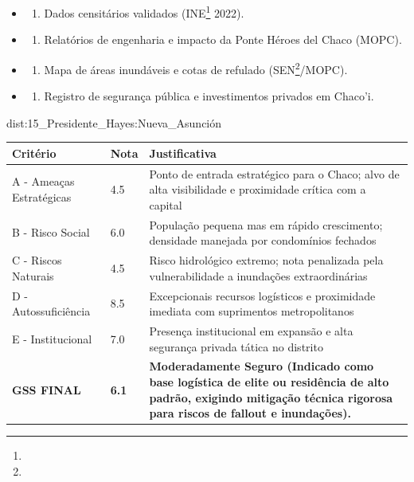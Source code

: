 {\begin{itemize}
\tightlist
\item
  \begin{enumerate}
  \def\labelenumi{\arabic{enumi})}
  \tightlist
  \item
    Dados censitários validados (INE\footnote{\fineINE} 2022).
  \end{enumerate}
\item
  \begin{enumerate}
  \def\labelenumi{\arabic{enumi})}
  \setcounter{enumi}{1}
  \tightlist
  \item
    Relatórios de engenharia e impacto da Ponte Héroes del Chaco (MOPC).
  \end{enumerate}
\item
  \begin{enumerate}
  \def\labelenumi{\arabic{enumi})}
  \setcounter{enumi}{2}
  \tightlist
  \item
    Mapa de áreas inundáveis e cotas de refulado (SEN\footnote{\fineSEN}/\allowbreak MOPC).
  \end{enumerate}
\item
  \begin{enumerate}
  \def\labelenumi{\arabic{enumi})}
  \setcounter{enumi}{3}
  \tightlist
  \item
    Registro de segurança pública e investimentos privados em Chaco'i.
  \end{enumerate}
\end{itemize}}{dist:15_Presidente_Hayes:Nueva_Asunción}
\begin{table}[ht!]
\small \begin{tabular}{p{3.0cm}p{0.8cm}p{6.0cm}} \toprule
\textbf{Critério} & \textbf{Nota} & \textbf{Justificativa} \\ \midrule
A - Ameaças Estratégicas & 4.5 & Ponto de entrada estratégico para o Chaco; alvo de alta visibilidade e proximidade crítica com a capital \\
B - Risco Social & 6.0 & População pequena mas em rápido crescimento; densidade manejada por condomínios fechados \\
C - Riscos Naturais & 4.5 & Risco hidrológico extremo; nota penalizada pela vulnerabilidade a inundações extraordinárias \\
D - Autossuficiência & 8.5 & Excepcionais recursos logísticos e proximidade imediata com suprimentos metropolitanos \\
E - Institucional & 7.0 & Presença institucional em expansão e alta segurança privada tática no distrito \\
\midrule \textbf{GSS FINAL} & \textbf{6.1} & \textbf{Moderadamente Seguro (Indicado como base logística de elite ou residência de alto padrão, exigindo mitigação técnica rigorosa para riscos de fallout e inundações).} \\ \bottomrule \end{tabular}
\end{table}
